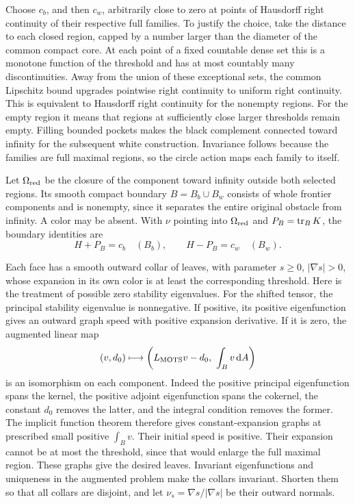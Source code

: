 Choose $c_b$, and then $c_w$, arbitrarily close to zero at points of
Hausdorff right continuity of their respective full families.  To
justify the choice, take the distance to each closed region, capped
by a number larger than the diameter of the common compact core.
At each point of a fixed countable dense set this is a monotone
function of the threshold and has at most countably many
discontinuities.  Away from the union of these exceptional sets,
the common Lipschitz bound upgrades pointwise right continuity to
uniform right continuity.  This is equivalent to Hausdorff right
continuity for the nonempty regions.  For the empty region it means
that regions at sufficiently close larger thresholds remain empty.
Filling bounded pockets makes the black complement connected toward
infinity for the subsequent white construction.  Invariance follows
because the families are full maximal regions, so the circle action
maps each family to itself.

Let $\Omega_{\rm red}$ be the closure of the component toward infinity
outside both selected regions.  Its smooth compact boundary
$B=B_b\cup B_w$ consists of whole frontier components and is nonempty,
since it separates the entire original obstacle from infinity.  A
color may be absent.  With $\nu$ pointing into $\Omega_{\rm red}$ and
$P_B=\operatorname{tr}_BK$, the boundary identities are
\begin{equation}\label{d:threshold-boundary}
 H+P_B=c_b\quad(B_b),\qquad H-P_B=c_w\quad(B_w).
\end{equation}

Each face has a smooth outward collar of leaves, with parameter
$s\ge0$, $|\nabla s|>0$, whose expansion in its own color is at least
the corresponding threshold.  Here is the treatment of possible
zero stability eigenvalues.  For the shifted tensor, the principal
stability eigenvalue is nonnegative.  If positive, its positive
eigenfunction gives an outward graph speed with positive expansion
derivative.  If it is zero, the augmented linear map
\[
 (v,d_0)\longmapsto
 \left(L_{\rm MOTS}v-d_0,\ \int_Bv\,\mathrm d A\right)
\]
is an isomorphism on each component.  Indeed the positive principal
eigenfunction spans the kernel, the positive adjoint eigenfunction
spans the cokernel, the constant $d_0$ removes the latter, and the
integral condition removes the former.  The implicit function
theorem therefore gives constant-expansion graphs at prescribed
small positive $\int_Bv$.  Their initial speed is positive.  Their
expansion cannot be at most the threshold, since that would enlarge
the full maximal region.  These graphs give the desired leaves.
Invariant eigenfunctions and uniqueness in the augmented problem
make the collars invariant.  Shorten them so that all collars are
disjoint, and let $\nu_s=\nabla s/|\nabla s|$ be their outward normals.

